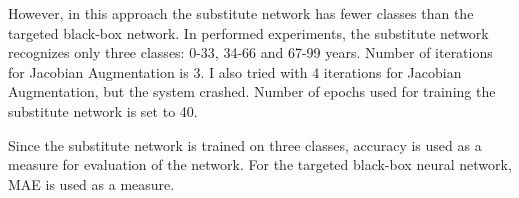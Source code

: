 However, in this approach the substitute network has fewer classes than the targeted black-box network. In performed experiments, the substitute network recognizes only three classes: 0-33, 34-66 and 67-99 years. Number of iterations for Jacobian Augmentation is 3. I also tried with 4 iterations for Jacobian Augmentation, but the system crashed. Number of epochs used for training the substitute network is set to 40.

Since the substitute network is trained on three classes, accuracy is used as a measure for evaluation of the network. For the targeted black-box neural network, MAE is used as a measure.

